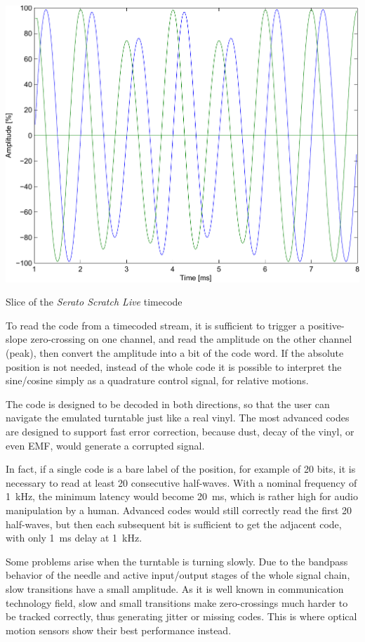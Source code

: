 \documentclass[a4paper,10pt]{article}
\makeatletter
\newenvironment{figurehere}{\def\@captype{figure}\vspace{2ex}}{\vspace{2ex}}
\makeatother
\begin{document}
\begin{multicols}{2}
\begin{figurehere}
	\centering
	\includegraphics[keepaspectratio=true,width=\columnwidth]{images/serato_timecode_slice.pdf}
	\caption{Slice of the \emph{Serato Scratch Live} timecode}
	\label{fig:serato_timecode_slice}
\end{figurehere}

To read the code from a timecoded stream, it is sufficient to trigger a
positive-slope zero-crossing on one channel, and read the amplitude on the
other channel (peak), then convert the amplitude into a bit of the code
word. If the absolute position is not needed, instead of the whole code it
is possible to interpret the sine/cosine simply as a quadrature control
signal, for relative motions.

The code is designed to be decoded in both directions, so that the user can
navigate the emulated turntable just like a real vinyl. The most advanced
codes are designed to support fast error correction, because dust, decay of
the vinyl, or even EMF, would generate a corrupted signal.

In fact, if a single code is a bare label of the position, for example of 20
bits, it is necessary to read at least 20 consecutive half-waves. With a
nominal frequency of 1~kHz, the minimum latency would become 20~ms, which is
rather high for audio manipulation by a human. Advanced codes would still
correctly read the first 20 half-waves, but then each subsequent bit is
sufficient to get the adjacent code, with only 1~ms delay at 1~kHz.

Some problems arise when the turntable is turning slowly. Due to the bandpass
behavior of the needle and active input/output stages of the whole signal
chain, slow transitions have a small amplitude. As it is well known in
communication technology field, slow and small transitions make zero-crossings
much harder to be tracked correctly, thus generating jitter or missing codes.
This is where optical motion sensors show their best performance instead.



\end{multicols}
\end{document}
